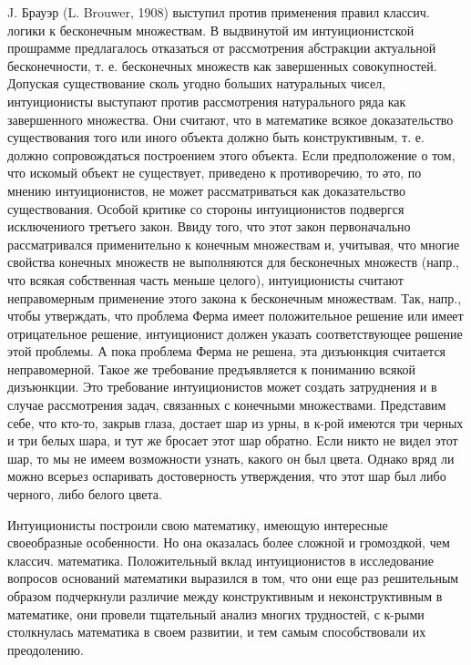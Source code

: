 \documentclass[10pt]{article}
\begin{document}
J. Брауэр (L. Brouwer, 1908) выступил против применения правил классич. логики к бесконечным множествам. В выдвинутой им интуиционистской прошрамме предлагалось отказаться от рассмотрения абстракции актуальной бесконечности, т. е. бесконечных множеств как завершенных совокупностей. Допуская существование сколь угодно больших натуральных чисел, интуиционисты выступают против рассмотрения натурального ряда как завершенного множества. Они считают, что в математике всякое доказательство существования того или иного объекта должно быть конструктивным, т. е. должно сопровождаться построением этого объекта. Если предположение о том, что искомый объект не существует, приведено к противоречию, то әто, по мнению интуиционистов, не может рассматриваться как доказательство существования. Особой критике со стороны интуиционистов подвергся исключениого третъего закон. Ввиду того, что этот закон первоначально рассматривался применительно к конечным множествам и, учитывая, что многие свойства конечных множеств не выполняются для бесконечных множеств (напр., что всякая собственная часть меньше целого), интуиционисты считают неправомерным применение этого закона к бесконечным множествам. Так, напр., чтобы утверждать, что проблема Ферма имеет положительное решение или имеет отрицательное решение, интуиционист должен указать соответствующее рөшение этой проблемы. А пока проблема Ферма не решена, эта дизъюнкция считается неправомерной. Такое же требование предъявляется к пониманию всякой дизъюнкции. Это требование интуиционистов может создать затруднения и в случае рассмотрения задач, связанных с конечными множествами. Представим себе, что кто-то, закрыв глаза, достает шар из урны, в к-рой имеются три черных и три белых шара, и тут же бросает этот шар обратно. Если никто не видел этот шар, то мы не имеем возможности узнать, какого он был цвета. Однако вряд ли можно всерьез оспаривать достоверность утверждения, что этот шар был либо черного, либо белого цвета.



Интуиционисты построили свою математику, имеющую интересные своеобразные особенности. Но она оказалась более сложной и громоздкой, чем классич. математика. Положительный вклад интуиционистов в исследование вопросов оснований математики выразился в том, что они еще раз решительным образом подчеркнули различие между конструктивным и неконструктивным в математике, они провели тщательный анализ многих трудностей, с к-рыми столкнулась математика в своем развитии, и тем самым способствовали их преодолению.
\end{document}
